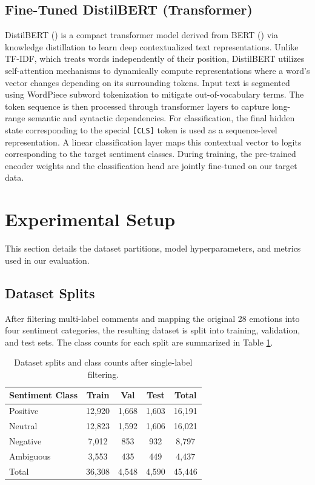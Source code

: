 \documentclass[
  conference,
  letterpaper]{IEEEtran}
\begin{document}
\subsection{Fine-Tuned DistilBERT
(Transformer)}\label{fine-tuned-distilbert-transformer}

DistilBERT () is a
compact transformer model derived from BERT
() via knowledge
distillation to learn deep contextualized text representations. Unlike
TF-IDF, which treats words independently of their position, DistilBERT
utilizes self-attention mechanisms to dynamically compute
representations where a word's vector changes depending on its
surrounding tokens. Input text is segmented using WordPiece subword
tokenization to mitigate out-of-vocabulary terms. The token sequence is
then processed through transformer layers to capture long-range semantic
and syntactic dependencies. For classification, the final hidden state
corresponding to the special \texttt{{[}CLS{]}} token is used as a
sequence-level representation. A linear classification layer maps this
contextual vector to logits corresponding to the target sentiment
classes. During training, the pre-trained encoder weights and the
classification head are jointly fine-tuned on our target data.

\section{Experimental Setup}\label{experimental-setup}

This section details the dataset partitions, model hyperparameters, and
metrics used in our evaluation.

\subsection{Dataset Splits}\label{dataset-splits}

After filtering multi-label comments and mapping the original 28
emotions into four sentiment categories, the resulting dataset is split
into training, validation, and test sets. The class counts for each
split are summarized in Table \ref{tab:dataset_splits}.

\begin{table}[h]
\centering
\caption{Dataset splits and class counts after single-label filtering.}
\label{tab:dataset_splits}
\footnotesize
\begin{tabular}{@{}lcccc@{}}
\toprule
Sentiment Class & Train & Val & Test & Total \\
\midrule
Positive & 12,920 & 1,668 & 1,603 & 16,191 \\
Neutral & 12,823 & 1,592 & 1,606 & 16,021 \\
Negative & 7,012 & 853 & 932 & 8,797 \\
Ambiguous & 3,553 & 435 & 449 & 4,437 \\
\midrule
Total & 36,308 & 4,548 & 4,590 & 45,446 \\
\bottomrule
\end{tabular}
\end{table}
\end{document}

